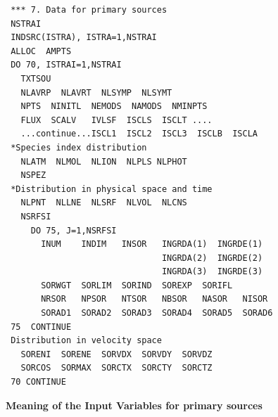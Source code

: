 \medskip

\noindent

\begin{verbatim}
 *** 7. Data for primary sources
 NSTRAI
 INDSRC(ISTRA), ISTRA=1,NSTRAI
 ALLOC  AMPTS
 DO 70, ISTRAI=1,NSTRAI
   TXTSOU
   NLAVRP  NLAVRT  NLSYMP  NLSYMT
   NPTS  NINITL  NEMODS  NAMODS  NMINPTS
   FLUX  SCALV   IVLSF  ISCLS  ISCLT ....
   ...continue...ISCL1  ISCL2  ISCL3  ISCLB  ISCLA
 *Species index distribution
   NLATM  NLMOL  NLION  NLPLS NLPHOT
   NSPEZ
 *Distribution in physical space and time
   NLPNT  NLLNE  NLSRF  NLVOL  NLCNS
   NSRFSI
     DO 75, J=1,NSRFSI
       INUM    INDIM   INSOR   INGRDA(1)  INGRDE(1)
                               INGRDA(2)  INGRDE(2)
                               INGRDA(3)  INGRDE(3)
       SORWGT  SORLIM  SORIND  SOREXP  SORIFL
       NRSOR   NPSOR   NTSOR   NBSOR   NASOR   NISOR
       SORAD1  SORAD2  SORAD3  SORAD4  SORAD5  SORAD6
 75  CONTINUE
 Distribution in velocity space
   SORENI  SORENE  SORVDX  SORVDY  SORVDZ
   SORCOS  SORMAX  SORCTX  SORCTY  SORCTZ
 70 CONTINUE
\end{verbatim}

\newpage
{\bf Meaning of the Input Variables for primary sources}

\medskip

\noindent

